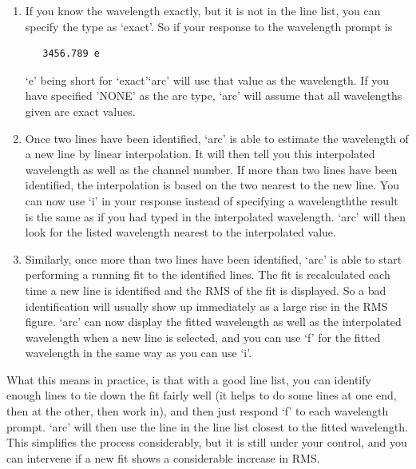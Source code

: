 \begin{enumerate}
\item
   If you know the wavelength exactly, but it is not in the line list,
   you can specify the type as `exact'.  So if your response to the
   wavelength prompt is

\begin{verbatim}
   3456.789 e
\end{verbatim}

   `e' being short for `exact'\latorhtm{---}{-}`arc' will use that value
   as the
   wavelength. If you have specified 'NONE' as the arc type, `arc' will
   assume that all wavelengths given are exact values.

\item
   Once two lines have been identified, `arc' is able to estimate the
   wavelength of a new line by linear interpolation.  It will then tell
   you this interpolated wavelength as well as the channel number.  If
   more than two lines have been identified, the interpolation is based
   on the two nearest to the new line.  You can now use `i' in your
   response instead of specifying a wavelength\latorhtm{---}{-}the result is
   the same
   as if you had typed in the interpolated wavelength.  `arc' will then
   look for the listed wavelength nearest to the interpolated value.

\item
   Similarly, once more than two lines have been identified, `arc' is
   able to start performing a running fit to the identified lines.  The
   fit is recalculated each time a new line is identified and the RMS of
   the fit is displayed.  So a bad identification will usually show up
   immediately as a large rise in the RMS figure.  `arc' can now display
   the fitted wavelength as well as the interpolated wavelength when a
   new line is selected, and you can use `f' for the fitted wavelength
   in the same way as you can use `i'.
\end{enumerate}

   What this means in practice, is that with a good line list, you can
   identify enough lines to tie down the fit fairly well (it helps to do
   some lines at one end, then at the other, then work in), and then
   just respond `f' to each wavelength prompt.  `arc' will then use the
   line in the line list closest to the fitted wavelength.  This
   simplifies the process considerably, but it is still under your
   control, and you can intervene if a new fit shows a considerable
   increase in RMS.

